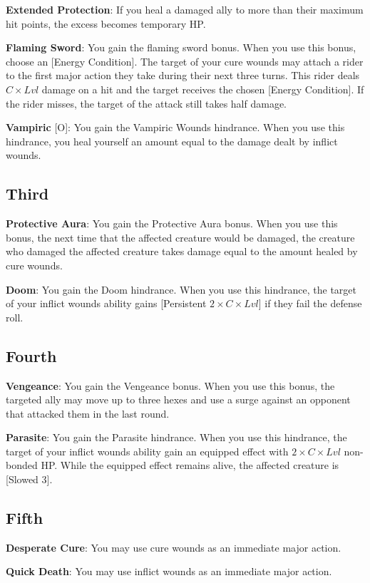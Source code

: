 \begin{multicols*}{2}
\textbf{Extended Protection}: If you heal a damaged ally to more than their maximum hit points, the excess becomes temporary HP.

\textbf{Flaming Sword}: You gain the flaming sword bonus. When you use this bonus, choose an [Energy Condition]. The target of your cure wounds may attach a rider to the first major action they take during their next three turns. This rider deals $C \times Lvl$ damage on a hit and the target receives the chosen [Energy Condition]. If the rider misses, the target of the attack still takes half damage.

\textbf{Vampiric} [O]: You gain the Vampiric Wounds hindrance. When you use this hindrance, you heal yourself an amount equal to the damage dealt by inflict wounds.

\subsection*{Third \Facet\perk}
\textbf{Protective Aura}: You gain the Protective Aura bonus. When you use this bonus, the next time that the affected creature would be damaged, the creature who damaged the affected creature takes damage equal to the amount healed by cure wounds.

\textbf{Doom}: You gain the Doom hindrance. When you use this hindrance, the target of your inflict wounds ability gains [Persistent $2\times C\times Lvl$] if they fail the defense roll.

\subsection*{Fourth \Facet\perk}
\textbf{Vengeance}: You gain the Vengeance bonus. When you use this bonus, the targeted ally may move up to three hexes and use a surge against an opponent that attacked them in the last round.

\textbf{Parasite}: You gain the Parasite hindrance. When you use this hindrance, the target of your inflict wounds ability gain an equipped effect with $2 \times C \times Lvl$ non-bonded HP.  While the equipped effect remains alive, the affected creature is [Slowed 3].

\subsection*{Fifth \Facet\perk}
\textbf{Desperate Cure}: You may use cure wounds as an immediate major action.

\textbf{Quick Death}: You may use inflict wounds as an immediate major action.


\end{multicols*}
